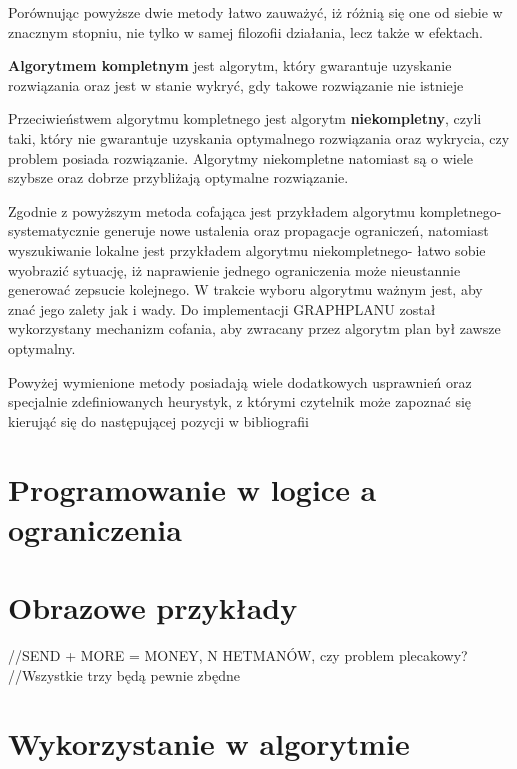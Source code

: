     Porównując powyższe dwie metody łatwo zauważyć, iż różnią się one od siebie w znacznym stopniu, nie tylko w samej filozofii działania, lecz także 
    w efektach.

    \begin{definition}
        \label{AlgorytmKompletny}
        \textbf{Algorytmem kompletnym} jest algorytm, który gwarantuje uzyskanie rozwiązania oraz jest w stanie 
        wykryć, gdy takowe rozwiązanie nie istnieje
    \end{definition}

    Przeciwieństwem algorytmu kompletnego jest algorytm \textbf{niekompletny}, czyli taki, który nie gwarantuje 
    uzyskania optymalnego rozwiązania oraz wykrycia, czy problem posiada rozwiązanie. Algorytmy niekompletne natomiast są o wiele 
    szybsze oraz dobrze przybliżają optymalne rozwiązanie. 

    Zgodnie z powyższym metoda cofająca jest przykładem algorytmu kompletnego- systematycznie generuje nowe ustalenia oraz propagacje ograniczeń,
    natomiast wyszukiwanie lokalne jest przykładem algorytmu niekompletnego- łatwo sobie wyobrazić sytuację, iż naprawienie jednego ograniczenia 
    może nieustannie generować zepsucie kolejnego. W trakcie wyboru algorytmu ważnym jest, aby znać jego zalety jak i wady. Do implementacji 
    GRAPHPLANU został wykorzystany mechanizm cofania, aby zwracany przez algorytm plan był zawsze optymalny.



    Powyżej wymienione metody posiadają wiele dodatkowych usprawnień oraz specjalnie zdefiniowanych heurystyk,
    z którymi czytelnik może zapoznać się kierująć się do następującej pozycji w bibliografii \cite{CP}
\section{Programowanie w logice a ograniczenia}


\section{Obrazowe przykłady}

//SEND + MORE = MONEY, N HETMANÓW, czy problem plecakowy?
//Wszystkie trzy będą pewnie zbędne

\section{Wykorzystanie w algorytmie}

